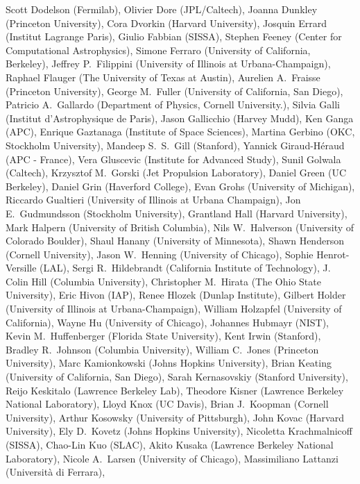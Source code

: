 Scott Dodelson (Fermilab),
Olivier Dore (JPL/Caltech),
Joanna Dunkley (Princeton University),
Cora Dvorkin (Harvard University),
Josquin Errard (Institut Lagrange Paris),
Giulio Fabbian (SISSA),
Stephen Feeney (Center for Computational Astrophysics),
Simone Ferraro (University of California, Berkeley),
Jeffrey P.~Filippini (University of Illinois at Urbana-Champaign),
Raphael Flauger (The University of Texas at Austin),
Aurelien A.~Fraisse (Princeton University),
George M.~Fuller (University of California, San Diego),
Patricio A.~Gallardo (Department of Physics, Cornell University.),
Silvia Galli (Institut d'Astrophysique de Paris),
Jason Gallicchio (Harvey Mudd),
Ken Ganga (APC),
Enrique Gaztanaga (Institute of Space Sciences),
Martina Gerbino (OKC, Stockholm University),
Mandeep S.~S.~Gill (Stanford),
Yannick Giraud-Héraud (APC - France),
Vera Gluscevic (Institute for Advanced Study),
Sunil Golwala (Caltech),
Krzysztof M.~Gorski (Jet Propulsion Laboratory),
Daniel Green (UC Berkeley),
Daniel Grin (Haverford College),
Evan Grohs (University of Michigan),
Riccardo Gualtieri (University of Illinois at Urbana Champaign),
Jon E.~Gudmundsson (Stockholm University),
Grantland Hall (Harvard University),
Mark Halpern (University of British Columbia),
Nils W.~Halverson (University of Colorado Boulder),
Shaul Hanany (University of Minnesota),
Shawn Henderson (Cornell University),
Jason W.~Henning (University of Chicago),
Sophie Henrot-Versille (LAL),
Sergi R.~Hildebrandt (California Institute of Technology),
J. Colin Hill (Columbia University),
Christopher M.~Hirata (The Ohio State University),
Eric Hivon (IAP),
Renee Hlozek (Dunlap Institute),
Gilbert Holder (University of Illinois at Urbana-Champaign),
William Holzapfel (University of California),
Wayne Hu (University of Chicago),
Johannes Hubmayr (NIST),
Kevin M.~Huffenberger (Florida State University),
Kent Irwin (Stanford),
Bradley R.~Johnson (Columbia University),
William C.~Jones (Princeton University),
Marc Kamionkowski (Johns Hopkins University),
Brian Keating (University of California, San Diego),
Sarah Kernasovskiy (Stanford University),
Reijo Keskitalo (Lawrence Berkeley Lab),
Theodore Kisner (Lawrence Berkeley National Laboratory),
Lloyd Knox (UC Davis),
Brian J.~Koopman (Cornell University),
Arthur Kosowsky (University of Pittsburgh),
John Kovac (Harvard University),
Ely D.~Kovetz (Johns Hopkins University),
Nicoletta Krachmalnicoff (SISSA),
Chao-Lin Kuo (SLAC),
Akito Kusaka (Lawrence Berkeley National Laboratory),
Nicole A.~Larsen (University of Chicago),
Massimiliano Lattanzi (Università di Ferrara),
